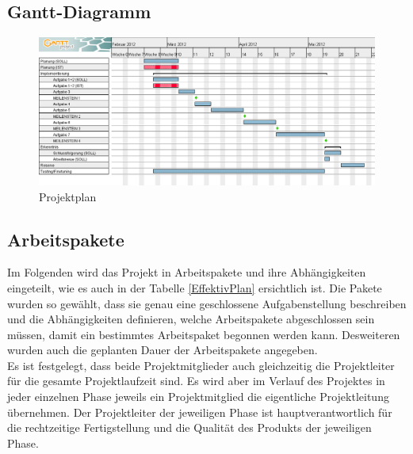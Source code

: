 \documentclass[a4paper,10pt]{article}
\begin{document}
\subsection{Gantt-Diagramm}
\begin{figure}[h!]
\centering
\includegraphics[width=0.8\linewidth]{img/projektplanung.png}
\caption{Projektplan}
\label{prplan}
\end{figure}

\subsection{Arbeitspakete}
Im Folgenden wird das Projekt in Arbeitspakete und ihre Abhängigkeiten eingeteilt, wie es auch in der Tabelle \ref{EffektivPlan} ersichtlich ist. Die Pakete wurden so gewählt, dass sie genau eine geschlossene Aufgabenstellung beschreiben und die Abhängigkeiten definieren, welche Arbeitspakete abgeschlossen sein müssen, damit ein bestimmtes Arbeitspaket begonnen werden kann. Desweiteren wurden auch die geplanten Dauer der Arbeitspakete angegeben. \\

Es ist festgelegt, dass beide Projektmitglieder auch gleichzeitig die Projektleiter für die gesamte Projektlaufzeit sind. Es wird aber im Verlauf des Projektes in jeder einzelnen Phase jeweils ein Projektmitglied die eigentliche Projektleitung übernehmen.
Der Projektleiter der jeweiligen Phase ist hauptverantwortlich für die rechtzeitige Fertigstellung und die Qualität des Produkts der jeweiligen Phase.
\end{document}
